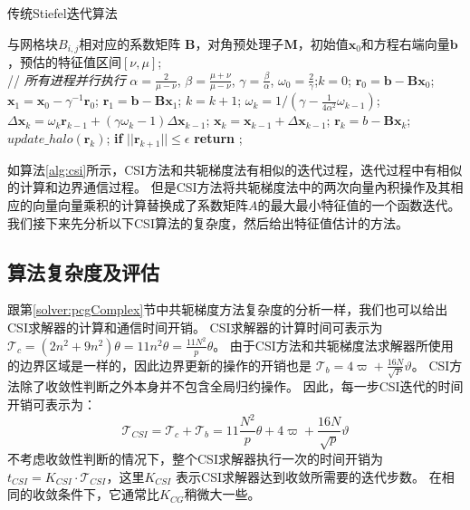 \begin{algorithm}[h]
\caption{传统Stiefel迭代算法}
\label{alg:csi}
\begin{algorithmic}[1]
\REQUIRE 与网格块$B_{i,j}$相对应的系数矩阵 $\textbf{B}$，对角预处理子$\textbf{M}$，初始值$\textbf{x}_0$和方程右端向量$\textbf{b}$，预估的特征值区间$[\nu,\mu]$;  \\
 // \qquad    \textit{所有进程并行执行}
\STATE $\alpha =\frac{2}{\mu -\nu}$, $ \beta = \frac{\mu +\nu}{\mu -\nu}$, $\gamma = \frac{\beta}{\alpha}$, $\omega_0 =\frac{ 2}{\gamma}$;\quad $k = 0$;
\STATE $\textbf{r}_0 = \textbf{b}-\textbf{B}\textbf{x}_0$; $\textbf{x}_1 =\textbf{x}_0 -\gamma^{-1}\textbf{r}_0$; $\textbf{r}_1 =\textbf{b} -\textbf{B}\textbf{x}_1$;
\STATE $k=k+1$;
\STATE $\omega_k = 1/(\gamma - \frac{1}{4\alpha^2}\omega_{k-1})$;  \label{AlgCsiIter}
\STATE $\Delta \textbf{x}_{k} =\omega_k\textbf{r}_{k-1}+(\gamma \omega_k-1)\Delta \textbf{x}_{k-1}$; \label{AlgCsiVec1}
\STATE $\textbf{x}_{k} =\textbf{x}_{k-1}+\Delta \textbf{x}_{k-1}$; \label{AlgCsiVec2}
\STATE $\textbf{r}_{k} =b- \textbf{B}\textbf{x}_{k}$;\label{AlgCsiVec3}
\STATE $update\_halo(\textbf{r}_k)$; \label{AlgCsiBound}
\STATE \textbf{if} $||\textbf{r}_{k+1}|| \le \epsilon$  \textbf{return} ;
\ENDIF\ENDWHILE
\end{algorithmic}
\end{algorithm}

如算法\ref{alg:csi}所示，CSI方法和共轭梯度法有相似的迭代过程，迭代过程中有相似的计算和边界通信过程。
但是CSI方法将共轭梯度法中的两次向量內积操作及其相应的向量向量乘积的计算替换成了系数矩阵$A$的最大最小特征值的一个函数迭代。 我们接下来先分析以下CSI算法的复杂度，然后给出特征值估计的方法。

\subsection{算法复杂度及评估} \label{solver:Algorithm:complex}

跟第\ref{solver:pcgComplex}节中共轭梯度方法复杂度的分析一样，我们也可以给出CSI求解器的计算和通信时间开销。
CSI求解器的计算时间可表示为
$\mathcal{T}_c =  (2 n^2 + 9n^2)\theta = 11n^2\theta =\frac{11N^2}{p}\theta$。 
由于CSI方法和共轭梯度法求解器所使用的边界区域是一样的，因此边界更新的操作的开销也是 $\mathcal{T}_b =4\varpi + \frac{16N}{\sqrt{P}}\vartheta$。 CSI方法除了收敛性判断之外本身并不包含全局归约操作。 
因此，每一步CSI迭代的时间开销可表示为： 　
\begin{equation}
\label{t_csi}
\mathcal{T}_{CSI} = \mathcal{T}_c + \mathcal{T}_b
= 11\frac{N^2}{p}\theta + 4\varpi + \frac{16N}{\sqrt{p}}\vartheta
\end{equation}
不考虑收敛性判断的情况下，整个CSI求解器执行一次的时间开销为$t_{CSI} = K_{CSI}\cdot \mathcal{T}_{CSI}$，这里$K_{CSI}$ 表示CSI求解器达到收敛所需要的迭代步数。 在相同的收敛条件下，它通常比$K_{CG}$稍微大一些。 


